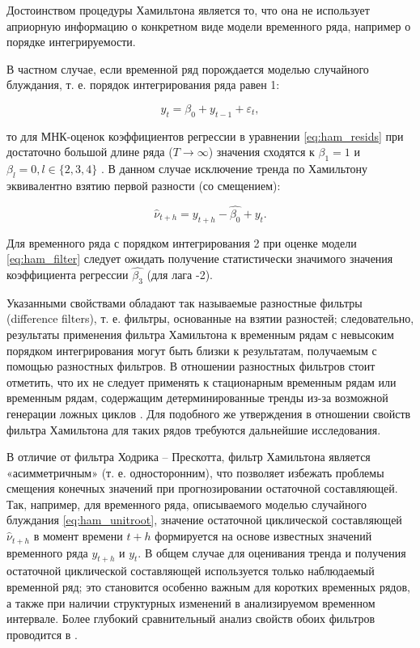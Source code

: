 \documentclass[a4paper,14pt]{extreport}
\begin{document}
	Достоинством процедуры Хамильтона является то, что она не использует априорную информацию о конкретном виде модели временного ряда, например о порядке интегрируемости. 
	
	В частном случае, если временной ряд порождается моделью случайного блуждания, т. е. порядок интегрирования ряда равен 1: 
	
	\begin{equation}
	y_t = \beta_0 + y_{t-1} + \varepsilon_t ,
	\label{eq:ham_unitroot}
	\end{equation}
	
	то для МНК-оценок коэффициентов регрессии в уравнении \ref{eq:ham_resids} при достаточно большой длине ряда ($T \rightarrow \infty$) значения сходятся к $\beta_1 = 1$ и $\beta_l = 0, l \in \{2, 3, 4\}$ \cite[с. 16-17]{hamHP}. В данном случае исключение тренда по Хамильтону эквивалентно взятию первой разности (со смещением):
	
	\begin{equation}
	\hat{\nu}_{t+h} = y_{t+h} - \hat{\beta_0} + y_{t} .
	\label{eq:ham_unitroot_resid}
	\end{equation}
	
	Для временного ряда с порядком интегрирования 2 при оценке модели \ref{eq:ham_filter} следует ожидать получение статистически значимого значения коэффициента регрессии $\hat{\beta_3}$  (для лага -2).  
	
	Указанными свойствами обладают так называемые разностные фильтры (difference filters), т. е. фильтры, основанные на взятии разностей; следовательно, результаты применения фильтра Хамильтона к временным рядам с невысоким порядком интегрирования могут быть близки к результатам, получаемым с помощью разностных фильтров. В отношении разностных фильтров стоит отметить, что их не следует применять к стационарным временным рядам или временным рядам, содержащим детерминированные тренды из-за возможной генерации ложных циклов \cite{schuler_detrend, harvey_detrend}. Для подобного же утверждения в отношении свойств фильтра Хамильтона для таких рядов требуются дальнейшие исследования. 
	
	В отличие от фильтра Ходрика – Прескотта, фильтр Хамильтона является «асимметричным» (т. е. односторонним), что позволяет избежать проблемы смещения конечных значений при прогнозировании остаточной составляющей. Так, например, для временного ряда, описываемого моделью случайного блуждания \ref{eq:ham_unitroot},  значение остаточной циклической составляющей $\hat{\nu}_{t+h}$ в момент времени $t+h$ формируется на основе известных значений временного ряда $y_{t+h}$ и $y_t$. В общем случае для оценивания тренда и получения остаточной циклической составляющей используется только наблюдаемый временной ряд; это становится особенно важным для коротких временных рядов, а также при наличии структурных изменений в анализируемом временном интервале. Более глубокий сравнительный анализ свойств обоих фильтров проводится в \cite{schuler_detrend}.
	
\end{document}
